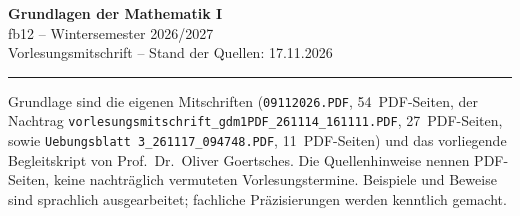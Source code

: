\documentclass[11pt, a4paper]{article}
\begin{document}
\begin{center}
    {\Large\textbf{\textcolor{primary}{Grundlagen der Mathematik I}}}\\[0.4em]
    {\large fb12 -- Wintersemester 2026/2027}\\[0.2em]
    {\small Vorlesungsmitschrift -- Stand der Quellen: 17.11.2026}\\[0.4em]
    \rule{\textwidth}{0.8pt}
\end{center}

\vspace{-0.5em}

\noindent Grundlage sind die eigenen Mitschriften
(\texttt{09112026.PDF}, 54~PDF-Seiten, der Nachtrag
\texttt{vorlesungsmitschrift\_gdm1PDF\_261114\_161111.PDF}, 27~PDF-Seiten,
sowie \texttt{Uebungsblatt 3\_261117\_094748.PDF}, 11~PDF-Seiten)
und das vorliegende Begleitskript von Prof.~Dr.~Oliver Goertsches.
Die Quellenhinweise nennen PDF-Seiten, keine nachträglich vermuteten
Vorlesungstermine. Beispiele und Beweise sind sprachlich ausgearbeitet;
fachliche Präzisierungen werden kenntlich gemacht.
\tableofcontents
\clearpage









\end{document}
